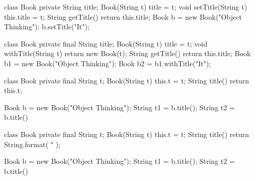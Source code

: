 \documentclass{article}
\begin{document}

\pptToc


\begin{pptWide}{2}
{\small\begin{ffcode}
class Book {
  private String title;
  Book(String t) { title = t; }
  void setTitle(String t) {
    this.title = t;
  }
  String getTitle() {
    return this.title;
  }
}
Book b = new Book("Object Thinking");
b.setTitle("It");
\end{ffcode}
}
\par\columnbreak\par
{\small\begin{ffcode}
class Book {
  private final String title;
  Book(String t) { title = t; }
  void withTitle(String t) {
    return new Book(t);
  }
  String getTitle() {
    return this.title;
  }
}
Book b1 = new Book("Object Thinking");
Book b2 = b1.withTitle("It");
\end{ffcode}
}
\end{pptWide}
\par
\plush{}


\begin{pptWide}{2}
{\small\begin{ffcode}
class Book {
  private final String t;
  Book(String t) { this.t = t; }
  String title() {
    return this.t;
  }
}
\end{ffcode}
}
\par\columnbreak\par
{\small\begin{ffcode}
Book b = new Book("Object Thinking");
String t1 = b.title();
String t2 = b.title()
\end{ffcode}
}
\end{pptWide}
\par
\plush{}

\begin{pptWide}{2}
{\small\begin{ffcode}
class Book {
  private final String t;
  Book(String t) { this.t = t; }
  String title() {
    return String.format(
      "%
    );
  }
}
\end{ffcode}
}
\par\columnbreak\par
{\small\begin{ffcode}
Book b = new Book("Object Thinking");
String t1 = b.title();
String t2 = b.title()
\end{ffcode}
}
\end{pptWide}
\par
\plush{}
\end{document}
